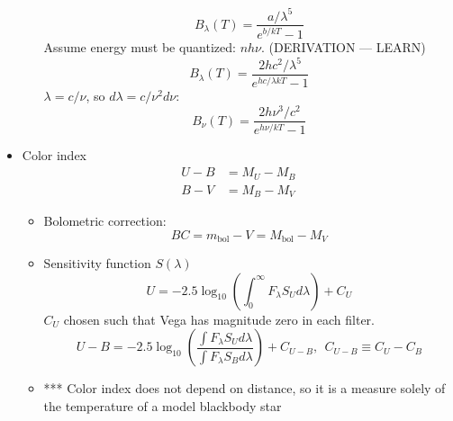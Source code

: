 \documentclass[12pt]{article}
\begin{document}
\begin{itemize}
\begin{itemize}
\begin{equation}
B_\lambda(T) = \frac{a/\lambda^5}{e^{b/kT} - 1}
\end{equation}
Assume energy must be quantized: $nh\nu$. (DERIVATION --- LEARN)
\begin{equation}
B_\lambda(T) = \frac{2hc^2/\lambda^5}{e^{hc/\lambda k T} - 1}
\end{equation}
$\lambda = c/\nu$, so $d\lambda = c/\nu^2 d\nu$:
\begin{equation}
B_\nu(T) = \frac{2 h \nu^3/c^2}{e^{h\nu/k T} - 1}
\end{equation}
\end{itemize}
\item Color index
\begin{align*}
U - B &= M_U - M_B \\
B - V &= M_B - M_V
\end{align*}
\begin{itemize}
\item Bolometric correction:
\begin{equation}
BC = m_\text{bol} - V = M_\text{bol} - M_V
\end{equation}
\item Sensitivity function $S(\lambda)$
\begin{equation}
U = -2.5\log_{10}\left(\int_0^\infty F_\lambda S_U d\lambda\right)+C_U
\end{equation}
$C_U$ chosen such that Vega has magnitude zero in each filter.
\begin{equation}
U - B = -2.5\log_{10}\left(\frac{\int F_\lambda S_U d\lambda}{\int F_\lambda S_B d\lambda}\right)+C_{U-B},~~C_{U-B} \equiv C_U - C_B
\end{equation}
\item *** Color index does not depend on distance, so it is a measure solely of the temperature of a model blackbody star
\end{itemize}
\end{itemize}
\end{document}
